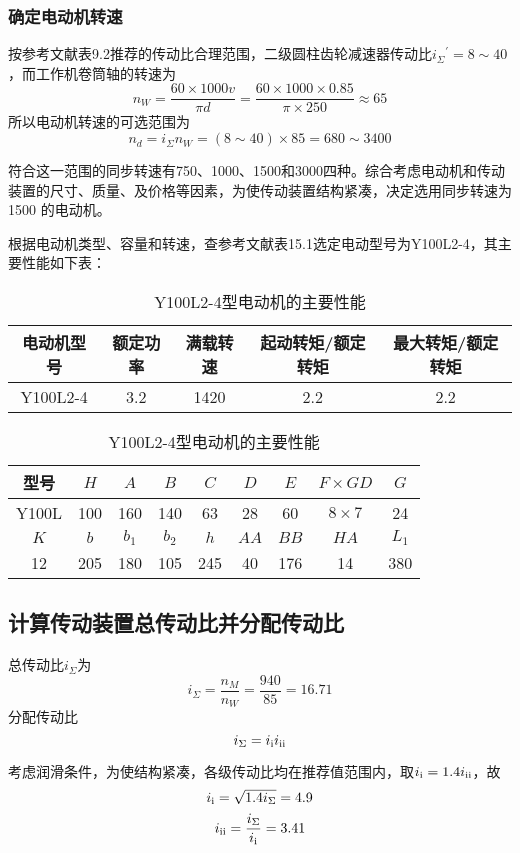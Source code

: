 \subsubsection{确定电动机转速}
按参考文献\cite{1}表9.2推荐的传动比合理范围，二级圆柱齿轮减速器传动比${i_{\Sigma}}^\prime=8\sim 40$，而工作机卷筒轴的转速为
$$n_W=\frac{60\times 1000v}{\pi d}=\frac{60\times 1000\times 0.85}{\pi\times 250}\approx 65$$
所以电动机转速的可选范围为
$$n_d={i_\Sigma}n_W=\left(8\sim 40\right)\times 85=680\sim 3400$$
\par 符合这一范围的同步转速有750、1000、1500和3000四种。综合考虑电动机和传动装置的尺寸、质量、及价格等因素，为使传动装置结构紧凑，决定选用同步转速为1500 的电动机。
\par 根据电动机类型、容量和转速，查参考文献\cite{1}表15.1选定电动型号为Y100L2-4，其主要性能如下表：
\begin{table}[H]
	\begin{center}
		\caption{Y100L2-4型电动机的主要性能}
		\begin{tabular}{ccccc}
		\toprule
		电动机型号& 额定功率 &  满载转速&  起动转矩/额定转矩 &最大转矩/额定转矩 \\
		\midrule
		Y100L2-4& 3.2 & 1420 & 2.2 & 2.2 \\
		\bottomrule
		\end{tabular}
	\end{center}
\end{table}
\begin{table}[H]
	\begin{center}
		\caption{ Y100L2-4型电动机的主要性能}
		\begin{tabular}{ccccccccc}
			\toprule
			型号 & $H$ & $A$ & $B$ & $C$ & $D$ & $E$ & $F\times GD$ & $G$\\
			\midrule
			Y100L& 100 & 160 & 140 & 63 & 28 & 60 & $8\times 7$ &24 \\
			\midrule[0.4mm]
			  $K$ & $b$ & $b_1$ & $b_2$ & $h$ & $AA$ & $BB$ & $HA$ & $L_1$ \\
			 \midrule
			   12 & 205 & 180 & 105 & 245 & 40 & 176 & 14 & 380\\
			\bottomrule
		\end{tabular}
	\end{center}
\end{table}
\subsection{计算传动装置总传动比并分配传动比}
总传动比$i_\Sigma$为
$$i_{\Sigma}=\frac{n_M}{n_W}=\frac{940}{85}=16.71$$
分配传动比
$$i_{\Sigma}=i_{\mathrm{\uppercase\expandafter{\romannumeral1}}}i_{\mathrm{\uppercase\expandafter{\romannumeral2}}}$$
\par 考虑润滑条件，为使结构紧凑，各级传动比均在推荐值范围内，取$i_{\mathrm{\uppercase\expandafter{\romannumeral1}}}=1.4i_{\mathrm{\uppercase\expandafter{\romannumeral2}}}$，故
$$i_{\mathrm{\uppercase\expandafter{\romannumeral1}}}=\sqrt{1.4i_{\Sigma}}=4.9$$
$$i_{\mathrm{\uppercase\expandafter{\romannumeral2}}}=\frac{i_\Sigma}{i_{\mathrm{\uppercase\expandafter{\romannumeral1}}}}=3.41$$
